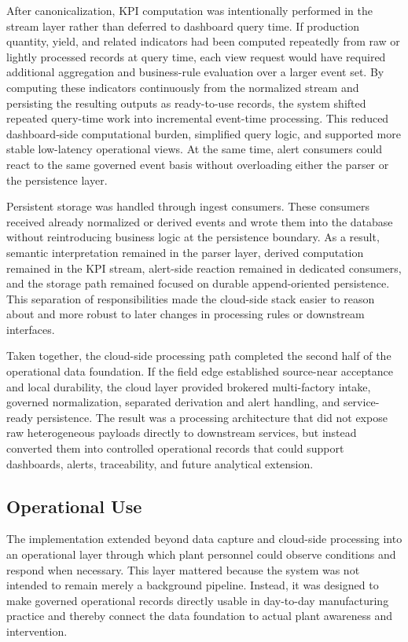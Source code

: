 \documentclass[systems,article,submit,pdftex,moreauthors]{Definitions/mdpi}
\begin{document}
After canonicalization, KPI computation was intentionally performed in the stream layer rather than deferred to dashboard query time. If production quantity, yield, and related indicators had been computed repeatedly from raw or lightly processed records at query time, each view request would have required additional aggregation and business-rule evaluation over a larger event set. By computing these indicators continuously from the normalized stream and persisting the resulting outputs as ready-to-use records, the system shifted repeated query-time work into incremental event-time processing. This reduced dashboard-side computational burden, simplified query logic, and supported more stable low-latency operational views. At the same time, alert consumers could react to the same governed event basis without overloading either the parser or the persistence layer.

Persistent storage was handled through ingest consumers. These consumers received already normalized or derived events and wrote them into the database without reintroducing business logic at the persistence boundary. As a result, semantic interpretation remained in the parser layer, derived computation remained in the KPI stream, alert-side reaction remained in dedicated consumers, and the storage path remained focused on durable append-oriented persistence. This separation of responsibilities made the cloud-side stack easier to reason about and more robust to later changes in processing rules or downstream interfaces.

Taken together, the cloud-side processing path completed the second half of the operational data foundation. If the field edge established source-near acceptance and local durability, the cloud layer provided brokered multi-factory intake, governed normalization, separated derivation and alert handling, and service-ready persistence. The result was a processing architecture that did not expose raw heterogeneous payloads directly to downstream services, but instead converted them into controlled operational records that could support dashboards, alerts, traceability, and future analytical extension.



\subsection{Operational Use}
\label{sec:operational_use}

The implementation extended beyond data capture and cloud-side processing into an operational layer through which plant personnel could observe conditions and respond when necessary. This layer mattered because the system was not intended to remain merely a background pipeline. Instead, it was designed to make governed operational records directly usable in day-to-day manufacturing practice and thereby connect the data foundation to actual plant awareness and intervention.
\end{document}
